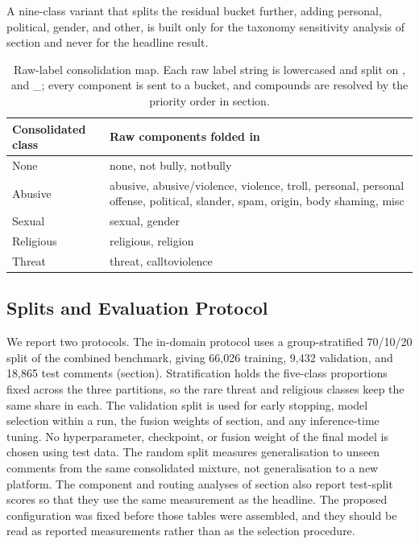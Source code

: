 \documentclass[11pt,a4paper]{article}
\def\cref#1{section}%
\def\texttt#1{#1}%
\def\emph#1{#1}%
\begin{document}
A nine-class variant that splits the residual bucket further, adding \texttt{personal}, \texttt{political}, \texttt{gender}, and \texttt{other}, is built only for the taxonomy sensitivity analysis of \cref{sec:ablation-results} and never for the headline result.

\begin{table}[!htbp]
\centering
\caption{Raw-label consolidation map. Each raw label string is lowercased and split on \texttt{,} and \texttt{\_}; every component is sent to a bucket, and compounds are resolved by the priority order in \cref{eq:priority}.}
\label{tab:consolidation}
\small
\begin{tabularx}{\textwidth}{@{}lX@{}}
\toprule
\textbf{Consolidated class} & \textbf{Raw components folded in} \\
\midrule
None & \texttt{none}, \texttt{not bully}, \texttt{notbully} \\
Abusive & \texttt{abusive}, \texttt{abusive/violence}, \texttt{violence}, \texttt{troll}, \texttt{personal}, \texttt{personal offense}, \texttt{political}, \texttt{slander}, \texttt{spam}, \texttt{origin}, \texttt{body shaming}, \texttt{misc} \\
Sexual & \texttt{sexual}, \texttt{gender} \\
Religious & \texttt{religious}, \texttt{religion} \\
Threat & \texttt{threat}, \texttt{calltoviolence} \\
\bottomrule
\end{tabularx}
\end{table}

\subsection{Splits and Evaluation Protocol}
\label{sec:splits}

We report two protocols. The in-domain protocol uses a group-stratified 70/10/20 split of the combined benchmark, giving 66{,}026 training, 9{,}432 validation, and 18{,}865 test comments (\cref{tab:split}). Stratification holds the five-class proportions fixed across the three partitions, so the rare \emph{threat} and \emph{religious} classes keep the same share in each. The validation split is used for early stopping, model selection within a run, the fusion weights of \cref{eq:weightopt}, and any inference-time tuning. No hyperparameter, checkpoint, or fusion weight of the final model is chosen using test data. The random split measures generalisation to unseen comments from the same consolidated mixture, not generalisation to a new platform. The component and routing analyses of \cref{sec:ablation-results,sec:scriptmask-results} also report test-split scores so that they use the same measurement as the headline. The proposed configuration was fixed before those tables were assembled, and they should be read as reported measurements rather than as the selection procedure.
\end{document}
